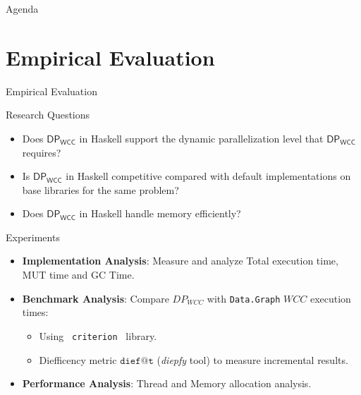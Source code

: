 \documentclass{beamer}
\newcommand{\dpwcc}{\mathsf{DP_{WCC}}}
\begin{document}
  \begin{frame}{Agenda}
    \section{Empirical Evaluation}
    \tableofcontents[currentsection]
  \end{frame}


  \begin{frame}[fragile]{Empirical Evaluation}
    \begin{block}{Research Questions}
      \begin{itemize}
            \item Does $\dpwcc$ in Haskell support the dynamic parallelization level that $\dpwcc$ requires?
            \item Is $\dpwcc$ in Haskell competitive compared with default implementations on base libraries for the same problem?
            \item Does $\dpwcc$ in Haskell handle memory efficiently?
        \end{itemize}        
    \end{block}
    \begin{block}{Experiments}
      \begin{itemize}
        \item \textbf{Implementation Analysis}: Measure and analyze Total execution time, MUT time and GC Time.
        \item \textbf{Benchmark Analysis}: Compare $DP_{WCC}$ with \texttt{Data.Graph} $WCC$ execution times:
        \begin{itemize}
          \item Using \texttt{ criterion } library.
          \item Diefficency metric $\mathtt{dief@t}$ (\textit{diepfy} tool) to measure incremental results.
        \end{itemize}
        \item \textbf{Performance Analysis}: Thread and Memory allocation analysis.
      \end{itemize}
    \end{block}
  \end{frame}
\end{document}
